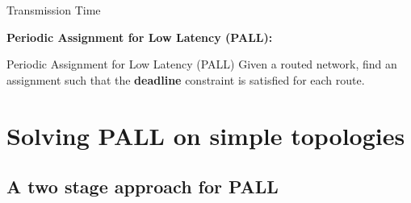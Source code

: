 \documentclass[10 pt]{beamer}
\begin{document}
\begin{frame}{Transmission Time}
\begin{center}
\end{center}

\pause
 \textbf{Periodic Assignment for Low Latency (PALL):}

 \begin{exampleblock}{Periodic Assignment for Low Latency (PALL)}
  Given a routed network, find an assignment such that the \textbf{deadline} constraint is satisfied for each route.
 \end{exampleblock}
\end{frame}

\section{Solving PALL on simple topologies}


\subsection{A two stage approach for PALL}
\end{document}
